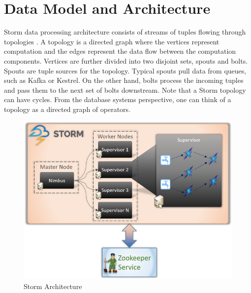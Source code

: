 \documentclass[9pt,twocolumn,twoside]{../../styles/osajnl}
\begin{document}
\section{Data Model and Architecture}
Storm data processing architecture consists of streams of tuples
flowing through topologies \cite{storm} . A topology is a directed
graph where the vertices represent computation and the edges represent
the data flow between the computation components. Vertices are further
divided into two disjoint sets, spouts and bolts. Spouts are tuple
sources for the topology.  Typical spouts pull data from queues, such
as Kafka \cite{kafka} or Kestrel. On the other hand, bolts process the
incoming tuples and pass them to the next set of bolts downstream.
Note that a Storm topology can have cycles. From the database systems
perspective, one can think of a topology as a directed graph of
operators.
\begin{figure}
  \includegraphics[width=\linewidth]{images/apache-storm.png}
  \caption{Storm Architecture}
  \label{Storm Architecture}
\end{figure}
\end{document}
